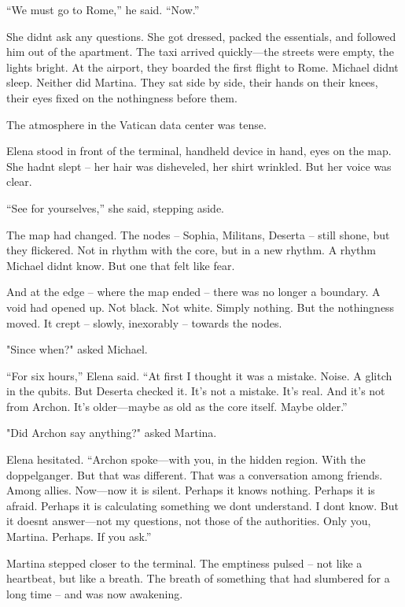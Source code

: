 \documentclass[
]{article}
\begin{document}
``We must go to Rome,'' he said. ``Now.''

She didn\textquotesingle t ask any questions. She got dressed, packed the essentials, and followed him out of the apartment. The taxi arrived quickly---the streets were empty, the lights bright. At the airport, they boarded the first flight to Rome. Michael didn\textquotesingle t sleep. Neither did Martina. They sat side by side, their hands on their knees, their eyes fixed on the nothingness before them.

The atmosphere in the Vatican data center was tense.

Elena stood in front of the terminal, handheld device in hand, eyes on the map. She hadn\textquotesingle t slept -- her hair was disheveled, her shirt wrinkled. But her voice was clear.

``See for yourselves,'' she said, stepping aside.

The map had changed. The nodes -- Sophia, Militans, Deserta -- still shone, but they flickered. Not in rhythm with the core, but in a new rhythm. A rhythm Michael didn\textquotesingle t know. But one that felt like fear.

And at the edge -- where the map ended -- there was no longer a boundary. A void had opened up. Not black. Not white. Simply nothing. But the nothingness moved. It crept -- slowly, inexorably -- towards the nodes.

"Since when?" asked Michael.

``For six hours,'' Elena said. ``At first I thought it was a mistake. Noise. A glitch in the qubits. But Deserta checked it. It's not a mistake. It's real. And it's not from Archon. It's older---maybe as old as the core itself. Maybe older.''

"Did Archon say anything?" asked Martina.

Elena hesitated. ``Archon spoke---with you, in the hidden region. With the doppelganger. But that was different. That was a conversation among friends. Among allies. Now---now it is silent. Perhaps it knows nothing. Perhaps it is afraid. Perhaps it is calculating something we don\textquotesingle t understand. I don\textquotesingle t know. But it doesn\textquotesingle t answer---not my questions, not those of the authorities. Only you, Martina. Perhaps. If you ask.''

Martina stepped closer to the terminal. The emptiness pulsed -- not like a heartbeat, but like a breath. The breath of something that had slumbered for a long time -- and was now awakening.
\end{document}
